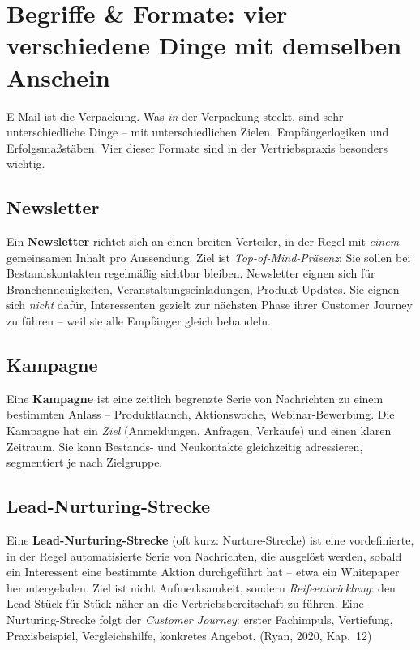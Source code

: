 \documentclass[11pt,a4paper,oneside]{article}
\newcommand{\fachbegriff}[1]{\textbf{#1}}
\newcommand{\quelle}[1]{{\footnotesize\color{lpGray}(#1)}}
\begin{document}
\section{Begriffe \& Formate: vier verschiedene Dinge mit demselben Anschein}

E-Mail ist die Verpackung. Was \emph{in} der Verpackung steckt, sind sehr unterschiedliche Dinge -- mit unterschiedlichen Zielen, Empfängerlogiken und Erfolgsmaßstäben. Vier dieser Formate sind in der Vertriebspraxis besonders wichtig.

\subsection{Newsletter}

Ein \fachbegriff{Newsletter} richtet sich an einen breiten Verteiler, in der Regel mit \emph{einem} gemeinsamen Inhalt pro Aussendung. Ziel ist \emph{Top-of-Mind-Präsenz}: Sie sollen bei Bestandskontakten regelmäßig sichtbar bleiben. Newsletter eignen sich für Branchenneuigkeiten, Veranstaltungseinladungen, Produkt-Updates. Sie eignen sich \emph{nicht} dafür, Interessenten gezielt zur nächsten Phase ihrer Customer Journey zu führen -- weil sie alle Empfänger gleich behandeln.

\subsection{Kampagne}

Eine \fachbegriff{Kampagne} ist eine zeitlich begrenzte Serie von Nachrichten zu einem bestimmten Anlass -- Produktlaunch, Aktionswoche, Webinar-Bewerbung. Die Kampagne hat ein \emph{Ziel} (Anmeldungen, Anfragen, Verkäufe) und einen klaren Zeitraum. Sie kann Bestands- und Neukontakte gleichzeitig adressieren, segmentiert je nach Zielgruppe.

\subsection{Lead-Nurturing-Strecke}

Eine \fachbegriff{Lead-Nurturing-Strecke} (oft kurz: Nurture-Strecke) ist eine vordefinierte, in der Regel automatisierte Serie von Nachrichten, die ausgelöst werden, sobald ein Interessent eine bestimmte Aktion durchgeführt hat -- etwa ein Whitepaper heruntergeladen. Ziel ist nicht Aufmerksamkeit, sondern \emph{Reifeentwicklung}: den Lead Stück für Stück näher an die Vertriebsbereitschaft zu führen. Eine Nurturing-Strecke folgt der \emph{Customer Journey}: erster Fachimpuls, Vertiefung, Praxisbeispiel, Vergleichshilfe, konkretes Angebot. \quelle{Ryan, 2020, Kap.~12}
\end{document}
